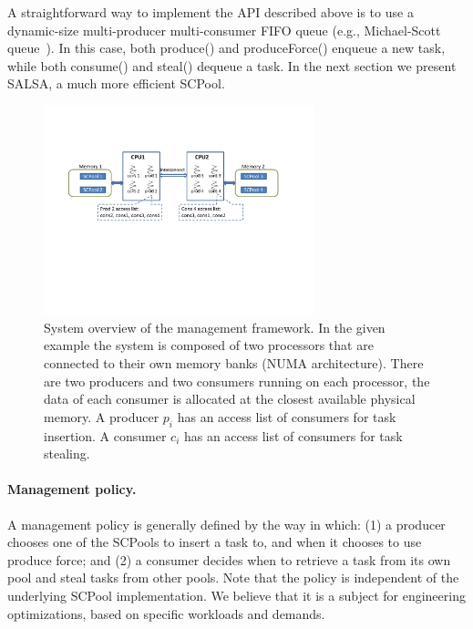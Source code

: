 A straightforward way to implement the API described above is to use a dynamic-size multi-producer multi-consumer FIFO queue (e.g., Michael-Scott queue~\cite{Michael:1996:SFP:248052.248106}).
In this case, both produce() and produceForce() enqueue a new task, while both consume() and steal() dequeue a task. In the next section we present SALSA, a much more efficient SCPool.

\begin{figure}[htb]
	\centering
	\includegraphics[width=0.7\textwidth]{figures/system-fig}
	\caption{\footnotesize{System overview of the management framework. In the given example the system is composed of two processors that are connected to their own memory banks (NUMA architecture). There are two producers and two consumers running on each processor, the data of each consumer is allocated at the closest available physical memory. A producer $p_i$ has an access list of consumers for task insertion. A consumer $c_i$ has an access list of consumers for task stealing. }}
	\label{fig:system-fig}
\end{figure}

\paragraph {Management policy.}
A management policy is generally defined by the way in which: (1) a producer chooses one of the SCPools to insert a task to, and when it chooses to use produce force; and (2) a consumer decides when to retrieve a task from its own pool and steal tasks from other pools. 
Note that the policy is independent of the underlying SCPool implementation. We believe that it is a subject for engineering optimizations, based on specific workloads and demands.



